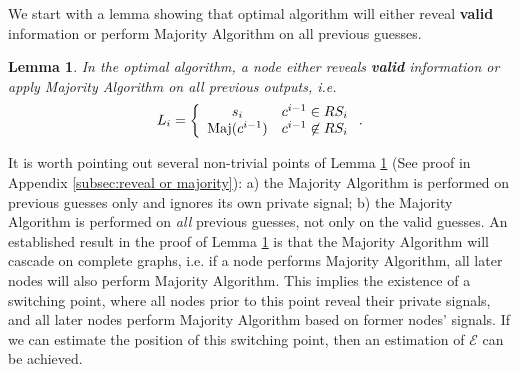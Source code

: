 \documentclass[a4paper,UKenglish]{lipics}
\newtheorem{lem}[thm]{Lemma}
\theoremstyle{definition}
\newcommand{\Maj}{\text{Maj}}
\begin{document}
We start with a lemma showing that optimal algorithm will either reveal \textbf{valid} information or perform Majority Algorithm on all previous guesses.
\begin{lem}
\label{lem:reveal or majority}
In the optimal algorithm, a node either reveals \textbf{valid} information or apply Majority Algorithm on all previous outputs, i.e.
\begin{equation*}
L_i 
= \left\{ 
	\begin{array}{c l}
		s_i & c^{i-1} \in RS_i \\
 		\Maj(c^{i-1}) & c^{i-1} \not \in RS_i
 	\end{array}
\right..
\end{equation*}
\end{lem}
It is worth pointing out several non-trivial points of Lemma \ref{lem:reveal or majority} (See proof in Appendix \ref{subsec:reveal or majority}):
	a) the Majority Algorithm is performed on previous guesses only and ignores its own private signal;
	b) the Majority Algorithm is performed on \emph{all} previous guesses, not only on the valid guesses.
An established result in the proof of Lemma \ref{lem:reveal or majority} is that the Majority Algorithm will cascade on complete graphs, i.e. if a node performs Majority Algorithm, all later nodes will also perform Majority Algorithm. 
This implies the existence of a switching point,  where all nodes prior to this point reveal their private signals, 
	and all later nodes perform Majority Algorithm based on former nodes' signals. 
If we can estimate the position of this switching point, then an estimation of $\mathcal{E}$ can be achieved.
\end{document}
